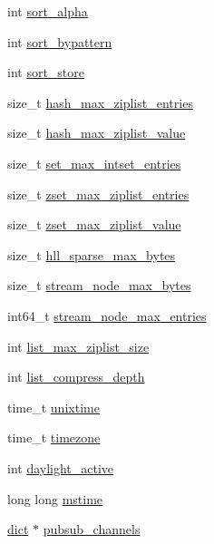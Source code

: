 \begin{DoxyCompactItemize}
int \hyperlink{structredis_server_af5b90328549c92ac3aeadcb79ce890a8}{sort\+\_\+alpha}
\item 
int \hyperlink{structredis_server_ac21e8e3dc0bf13b7822dfd50c26105c9}{sort\+\_\+bypattern}
\item 
int \hyperlink{structredis_server_a7cf5a502c3eed4d54cadaa419ed4799b}{sort\+\_\+store}
\item 
size\+\_\+t \hyperlink{structredis_server_aaa33ecfb95959d1b06853cc81e176ac2}{hash\+\_\+max\+\_\+ziplist\+\_\+entries}
\item 
size\+\_\+t \hyperlink{structredis_server_a0035ae0969e226acb750cf0859bfd2c5}{hash\+\_\+max\+\_\+ziplist\+\_\+value}
\item 
size\+\_\+t \hyperlink{structredis_server_a5e2c040b399186b37bf289ea387c55e2}{set\+\_\+max\+\_\+intset\+\_\+entries}
\item 
size\+\_\+t \hyperlink{structredis_server_a8e76d99dd09948088702e8d138fb5662}{zset\+\_\+max\+\_\+ziplist\+\_\+entries}
\item 
size\+\_\+t \hyperlink{structredis_server_ae1bafd11e7b9f269c3ab48acb8046f32}{zset\+\_\+max\+\_\+ziplist\+\_\+value}
\item 
size\+\_\+t \hyperlink{structredis_server_a40b0c5a28706a3d79fd7f38f76543796}{hll\+\_\+sparse\+\_\+max\+\_\+bytes}
\item 
size\+\_\+t \hyperlink{structredis_server_a293e6dedeaca2bf16929f9903380c7d3}{stream\+\_\+node\+\_\+max\+\_\+bytes}
\item 
int64\+\_\+t \hyperlink{structredis_server_a51f312f9239789ab90069710fa720bf1}{stream\+\_\+node\+\_\+max\+\_\+entries}
\item 
int \hyperlink{structredis_server_a96b12a6138b1998b70ecb702f40735e8}{list\+\_\+max\+\_\+ziplist\+\_\+size}
\item 
int \hyperlink{structredis_server_a59696a740cc848c44be295172dc0e052}{list\+\_\+compress\+\_\+depth}
\item 
time\+\_\+t \hyperlink{structredis_server_ac61bf06d5e2894efe1dd86783dbb4e1d}{unixtime}
\item 
time\+\_\+t \hyperlink{structredis_server_aaffc55850982666923b1b7497631ac79}{timezone}
\item 
int \hyperlink{structredis_server_a6baf24aca17821492f320e69d6707a7e}{daylight\+\_\+active}
\item 
long long \hyperlink{structredis_server_aaef517ca82e5d3ac5b2dbdebbd35f857}{mstime}
\item 
\hyperlink{structdict}{dict} $\ast$ \hyperlink{structredis_server_ac6c18a3bf3ec4d85777ca2db7d4a9b47}{pubsub\+\_\+channels}

\end{DoxyCompactItemize}

